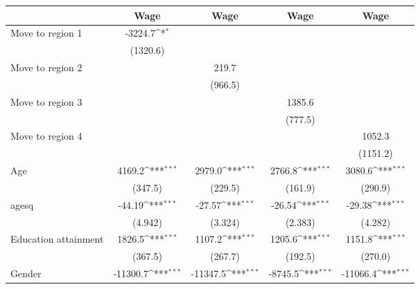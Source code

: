 {
\def\sym#1{\ifmmode^{#1}\else\(^{#1}\)\fi}
\begin{tabular*}{\textwidth}{@{\hskip\tabcolsep\extracolsep\fill}l*{4}{c}}
\toprule
                    &\multicolumn{1}{c}{Wage}&\multicolumn{1}{c}{Wage}&\multicolumn{1}{c}{Wage}&\multicolumn{1}{c}{Wage}\\
\midrule
Move to region 1    &     -3224.7\sym{*}  &                     &                     &                     \\
                    &    (1320.6)         &                     &                     &                     \\
\addlinespace
Move to region 2    &                     &       219.7         &                     &                     \\
                    &                     &     (966.5)         &                     &                     \\
\addlinespace
Move to region 3    &                     &                     &      1385.6         &                     \\
                    &                     &                     &     (777.5)         &                     \\
\addlinespace
Move to region 4    &                     &                     &                     &      1052.3         \\
                    &                     &                     &                     &    (1151.2)         \\
\addlinespace
Age                 &      4169.2\sym{***}&      2979.0\sym{***}&      2766.8\sym{***}&      3080.6\sym{***}\\
                    &     (347.5)         &     (229.5)         &     (161.9)         &     (290.9)         \\
\addlinespace
agesq               &      -44.19\sym{***}&      -27.57\sym{***}&      -26.54\sym{***}&      -29.38\sym{***}\\
                    &     (4.942)         &     (3.324)         &     (2.383)         &     (4.282)         \\
\addlinespace
Education attainment&      1826.5\sym{***}&      1107.2\sym{***}&      1205.6\sym{***}&      1151.8\sym{***}\\
                    &     (367.5)         &     (267.7)         &     (192.5)         &     (270.0)         \\
\addlinespace
Gender              &    -11300.7\sym{***}&    -11347.5\sym{***}&     -8745.5\sym{***}&    -11066.4\sym{***}\\

\end{tabular*}}
